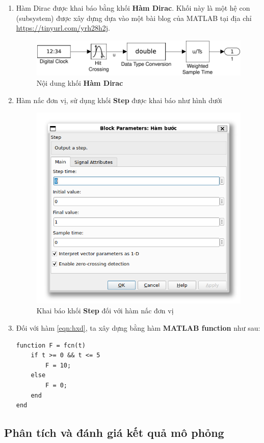 \documentclass[12pt,a4paper]{article}
\begin{document}
\begin{enumerate}
    \item Hàm Dirac được khai báo bằng khối \textbf{Hàm Dirac}. Khối này là một hệ con (subsystem) được xây dựng dựa vào một bài blog của MATLAB tại địa chỉ \url{https://tinyurl.com/yrh28h2j}.
    \begin{figure}[ht]
        \centering
        \includegraphics[width=\linewidth]{MATLAB_2.pdf}
        \caption{Nội dung khối \textbf{Hàm Dirac}}
    \end{figure}

    \item Hàm nấc đơn vị, sử dụng khối \textbf{Step} được khai báo như hình dưới
    \begin{figure}[ht]
        \centering
        \includegraphics[width=0.5\linewidth]{MATLAB_3.png}
        \caption{Khai báo khối \textbf{Step} đối với hàm nấc đơn vị}
    \end{figure}

    \newpage
    \item Đối với hàm \eqref{eqn:hxd}, ta xây dựng bằng hàm \textbf{MATLAB function} như sau:
    \begin{lstlisting}[style=matlabstyle,caption=Khai báo hàm \eqref{eqn:hxd}]
function F = fcn(t)
    if t >= 0 && t <= 5
        F = 10;
    else
        F = 0;
    end
end        
    \end{lstlisting}
\end{enumerate}

\newpage
\subsection{Phân tích và đánh giá kết quả mô phỏng}
\end{document}
